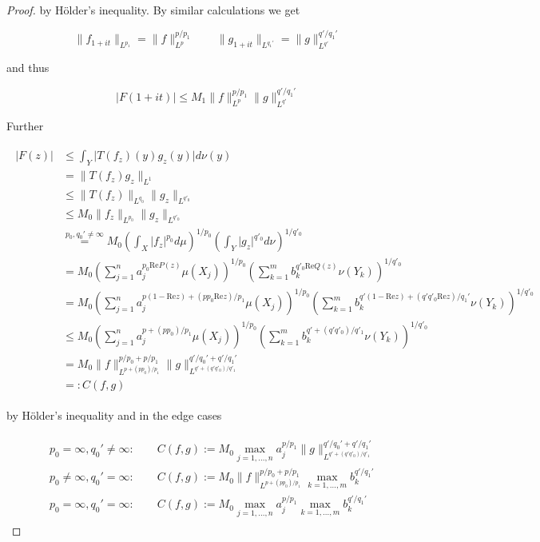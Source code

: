 \begin{proof}
				by H\"older's inequality. By similar calculations we get 
				
				\begin{equation}
					\|f_{1 + it}\|_{L^{p_1}} = \|f\|_{L^p}^{p/p_1} \qquad \|g_{1 + it}\|_{L^{q_1'}} = \|g\|_{L^{q'}}^{q'/q_1'}
				\end{equation}

				and thus 
				
				\begin{equation}
					\vert F(1 + it)\vert \leqslant M_1 \|f\|_{L^p}^{p/p_1}\|g\|_{L^{q'}}^{q'/q_1'}
				\end{equation}	

				Further 
		
		\begin{gather*}
			\begin{aligned}
				\vert F(z)\vert &\leqslant \int_Y\vert T(f_z)(y)g_z(y)\vert d\nu(y)\\
				&= \|T(f_z)g_z\|_{L^1}\\
				&\leqslant \|T(f_z)\|_{L^{q_0}} \|g_z\|_{L^{q'_0}}\\
				&\leqslant M_0 \|f_z\|_{L^{p_0}} \|g_z\|_{L^{q'_0}}\\
				&\overset{p_0,q_0' \neq \infty}{=} M_0 \left(\int_X \vert f_z \vert^{p_0} d\mu\right)^{1/p_0} \left(\int_Y \vert g_z \vert^{q'_0} d\nu\right)^{1/q'_0}\\
				&= M_0 \left( \sum\limits_{j = 1}^n a_j^{p_0\mathrm{Re}P(z)}\mu(X_j) \right)^{1/p_0} \left( \sum\limits_{k = 1}^m b_k^{q'_0\mathrm{Re}Q(z)} \nu(Y_k) \right)^{1/q'_0}\\
				&= M_0 \left( \sum\limits_{j = 1}^n a_j^{p(1 - \mathrm{Re}z) + (pp_0\mathrm{Re}z)/p_1}\mu(X_j) \right)^{1/p_0} \left( \sum\limits_{k = 1}^m b_k^{q'(1 - \mathrm{Re}z) + (q'q'_0\mathrm{Re} z)/q_1'} \nu(Y_k) \right)^{1/q'_0}\\
				&\leqslant M_0 \left( \sum\limits_{j = 1}^n a_j^{p + (pp_0)/p_1}\mu(X_j) \right)^{1/p_0} \left( \sum\limits_{k = 1}^m b_k^{q' + (q'q'_0)/q'_1} \nu(Y_k) \right)^{1/q'_0}\\
				&= M_0 \|f\|_{L^{p + (pp_0)/p_1}}^{p/p_0 + p/p_1} \|g\|_{L^{q' + (q'q'_0)/q'_1}}^{q'/q_0' + q'/q_1'}\\
				&=: C(f,g)
			\end{aligned}
		\end{gather*}
		
		
		by H\"older's inequality and in the edge cases
		
		\begin{gather*}
			\begin{aligned}
				&p_0 = \infty, q_0' \neq \infty: \qquad C(f,g) := M_0 \max_{j = 1,\hdots,n} a_j^{p/p_1} \|g\|_{L^{q' + (q'q'_0)/q'_1}}^{q'/q_0' + q'/q_1'}\\
				&p_0 \neq \infty, q_0' = \infty: \qquad C(f,g) :=  M_0 \|f\|_{L^{p + (pp_0)/p_1}}^{p/p_0 + p/p_1} \max_{k = 1,\hdots,m} b_k^{q'/q_1'}\\
				&p_0 = \infty, q_0' = \infty: \qquad C(f,g) := M_0 \max_{j = 1,\hdots,n} a_j^{p/p_1} \max_{k = 1,\hdots,m} b_k^{q'/q_1'}
			\end{aligned}
		\end{gather*}
		

\end{proof}
